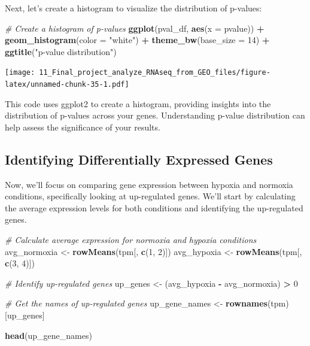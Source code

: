 \documentclass[
]{book}
\newenvironment{Shaded}{\begin{snugshade}}{\end{snugshade}}
\newcommand{\AttributeTok}[1]{\textcolor[rgb]{0.13,0.29,0.53}{#1}}
\newcommand{\CommentTok}[1]{\textcolor[rgb]{0.56,0.35,0.01}{\textit{#1}}}
\newcommand{\DecValTok}[1]{\textcolor[rgb]{0.00,0.00,0.81}{#1}}
\newcommand{\FunctionTok}[1]{\textcolor[rgb]{0.13,0.29,0.53}{\textbf{#1}}}
\newcommand{\NormalTok}[1]{#1}
\newcommand{\OtherTok}[1]{\textcolor[rgb]{0.56,0.35,0.01}{#1}}
\newcommand{\SpecialCharTok}[1]{\textcolor[rgb]{0.81,0.36,0.00}{\textbf{#1}}}
\newcommand{\StringTok}[1]{\textcolor[rgb]{0.31,0.60,0.02}{#1}}
\begin{document}
Next, let's create a histogram to visualize the distribution of p-values:

\begin{Shaded}
\begin{Highlighting}[]
\CommentTok{\# Create a histogram of p{-}values}
\FunctionTok{ggplot}\NormalTok{(pval\_df, }\FunctionTok{aes}\NormalTok{(}\AttributeTok{x =}\NormalTok{ pvalue)) }\SpecialCharTok{+}
  \FunctionTok{geom\_histogram}\NormalTok{(}\AttributeTok{color =} \StringTok{"white"}\NormalTok{) }\SpecialCharTok{+}
  \FunctionTok{theme\_bw}\NormalTok{(}\AttributeTok{base\_size =} \DecValTok{14}\NormalTok{) }\SpecialCharTok{+}
  \FunctionTok{ggtitle}\NormalTok{(}\StringTok{"p{-}value distribution"}\NormalTok{)}
\end{Highlighting}
\end{Shaded}

\texttt{[image: 11\_Final\_project\_analyze\_RNAseq\_from\_GEO\_files/figure-latex/unnamed-chunk-35-1.pdf]}

This code uses ggplot2 to create a histogram, providing insights into the distribution of p-values across your genes. Understanding p-value distribution can help assess the significance of your results.

\hypertarget{identifying-differentially-expressed-genes}{%
\subsection{Identifying Differentially Expressed Genes}\label{identifying-differentially-expressed-genes}}

Now, we'll focus on comparing gene expression between hypoxia and normoxia conditions, specifically looking at up-regulated genes. We'll start by calculating the average expression levels for both conditions and identifying the up-regulated genes.

\begin{Shaded}
\begin{Highlighting}[]
\CommentTok{\# Calculate average expression for normoxia and hypoxia conditions}
\NormalTok{avg\_normoxia }\OtherTok{\textless{}{-}} \FunctionTok{rowMeans}\NormalTok{(tpm[, }\FunctionTok{c}\NormalTok{(}\DecValTok{1}\NormalTok{, }\DecValTok{2}\NormalTok{)])}
\NormalTok{avg\_hypoxia }\OtherTok{\textless{}{-}} \FunctionTok{rowMeans}\NormalTok{(tpm[, }\FunctionTok{c}\NormalTok{(}\DecValTok{3}\NormalTok{, }\DecValTok{4}\NormalTok{)])}

\CommentTok{\# Identify up{-}regulated genes}
\NormalTok{up\_genes }\OtherTok{\textless{}{-}}\NormalTok{ (avg\_hypoxia }\SpecialCharTok{{-}}\NormalTok{ avg\_normoxia) }\SpecialCharTok{\textgreater{}} \DecValTok{0}

\CommentTok{\# Get the names of up{-}regulated genes}
\NormalTok{up\_gene\_names }\OtherTok{\textless{}{-}} \FunctionTok{rownames}\NormalTok{(tpm)[up\_genes]}

\FunctionTok{head}\NormalTok{(up\_gene\_names)}
\end{Highlighting}
\end{Shaded}
\end{document}
